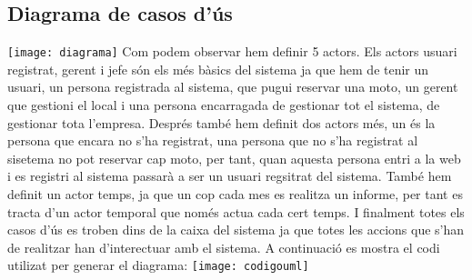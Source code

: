 \documentclass{article}
\begin{document}
\subsection{Diagrama de casos d'\'us}
\texttt{[image: diagrama]}
\newline
Com podem observar hem definir 5 actors. Els actors usuari registrat, gerent i jefe s\'on els m\'es b\`asics del sistema ja que hem de tenir un usuari, un persona registrada al sistema, que pugui reservar una moto, un gerent que gestioni el local i una persona encarragada de gestionar tot el sistema, de gestionar tota l'empresa.
\newline
Despr\'es tamb\'e hem definit dos actors m\'es, un \'es la persona que encara no s'ha registrat, una persona que no s'ha registrat al sisetema no pot reservar cap moto, per tant, quan aquesta persona entri a la web i es registri al sistema passar\`a a ser un usuari regsitrat del sistema. Tamb\'e hem definit un actor temps, ja que un cop cada mes es realitza un informe, per tant es tracta d'un actor temporal que nom\'es actua cada cert temps.
\newline
I finalment totes els casos d'\'us es troben dins de la caixa del sistema ja que totes les accions que s'han de realitzar han d'interectuar amb el sistema.
A continuaci\'o es mostra el codi utilizat per generar el diagrama:
\newline
\texttt{[image: codigouml]}
\end{document}
